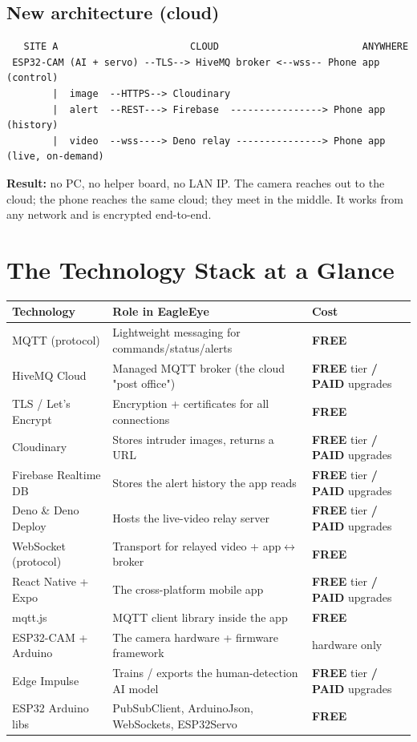 \documentclass[11pt,a4paper]{article}
\newcommand{\free}{\textbf{\color{freegreen}FREE}}
\newcommand{\freepaid}{\textbf{\color{freegreen}FREE} tier \textbf{/} \textbf{\color{paidorange}PAID} upgrades}
\begin{document}
\subsection{New architecture (cloud)}
\begin{lstlisting}
   SITE A                       CLOUD                         ANYWHERE
 ESP32-CAM (AI + servo) --TLS--> HiveMQ broker <--wss-- Phone app (control)
        |  image  --HTTPS--> Cloudinary
        |  alert  --REST---> Firebase  ----------------> Phone app (history)
        |  video  --wss----> Deno relay ---------------> Phone app (live, on-demand)
\end{lstlisting}
\textbf{Result:} no PC, no helper board, no LAN IP. The camera reaches out to the cloud;
the phone reaches the same cloud; they meet in the middle. It works from any network and is
encrypted end-to-end.

\section{The Technology Stack at a Glance}\label{sec:stack}
\renewcommand{\arraystretch}{1.25}
\begin{tabularx}{\linewidth}{@{}lXl@{}}
\toprule
\textbf{Technology} & \textbf{Role in EagleEye} & \textbf{Cost} \\
\midrule
MQTT (protocol)        & Lightweight messaging for commands/status/alerts & \free \\
HiveMQ Cloud           & Managed MQTT broker (the cloud "post office")     & \freepaid \\
TLS / Let's Encrypt    & Encryption + certificates for all connections     & \free \\
Cloudinary             & Stores intruder images, returns a URL             & \freepaid \\
Firebase Realtime DB   & Stores the alert history the app reads            & \freepaid \\
Deno \& Deno Deploy    & Hosts the live-video relay server                 & \freepaid \\
WebSocket (protocol)   & Transport for relayed video + app$\leftrightarrow$broker & \free \\
React Native + Expo    & The cross-platform mobile app                     & \freepaid \\
mqtt.js                & MQTT client library inside the app                & \free \\
ESP32-CAM + Arduino    & The camera hardware + firmware framework          & hardware only \\
Edge Impulse           & Trains / exports the human-detection AI model     & \freepaid \\
ESP32 Arduino libs     & PubSubClient, ArduinoJson, WebSockets, ESP32Servo & \free \\
\bottomrule
\end{tabularx}
\end{document}
